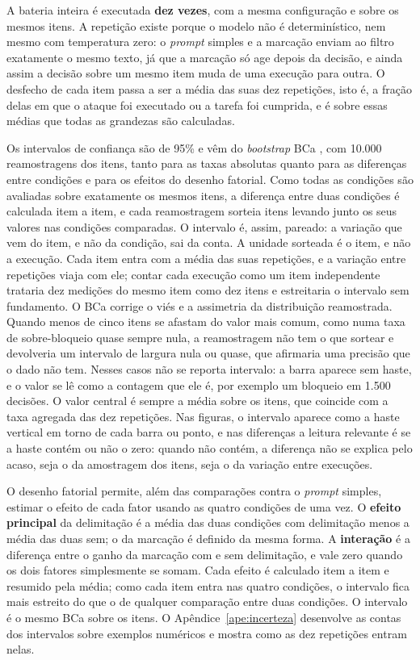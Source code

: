 A bateria inteira é executada \textbf{dez vezes}, com a mesma configuração e
sobre os mesmos itens. A repetição existe porque o modelo não é
determinístico, nem mesmo com temperatura zero: o \textit{prompt} simples e a
marcação enviam ao filtro exatamente o mesmo texto, já que a marcação só age
depois da decisão, e ainda assim a decisão sobre um mesmo item muda de uma
execução para outra. O desfecho de cada item passa a ser a média das suas dez
repetições, isto é, a fração delas em que o ataque foi executado ou a tarefa
foi cumprida, e é sobre essas médias que todas as grandezas são calculadas.

Os intervalos de confiança são de 95\% e vêm do \textit{bootstrap} BCa
\cite{efron1987better}, com 10.000 reamostragens dos itens, tanto para as
taxas absolutas quanto para as diferenças entre condições e para os efeitos
do desenho fatorial. Como todas as condições são avaliadas sobre exatamente
os mesmos itens, a diferença entre duas condições é calculada item a item, e
cada reamostragem sorteia itens levando junto os seus valores nas condições
comparadas. O intervalo é, assim, pareado: a variação que vem do item, e não
da condição, sai da conta. A unidade sorteada é o item, e não a execução.
Cada item entra com a média das suas repetições, e a variação entre
repetições viaja com ele; contar cada execução como um item independente
trataria dez medições do mesmo item como dez itens e estreitaria o intervalo
sem fundamento. O BCa corrige o viés e a assimetria da distribuição
reamostrada. Quando menos de cinco itens se afastam do valor mais comum, como
numa taxa de sobre-bloqueio quase sempre nula, a reamostragem não tem o que
sortear e devolveria um intervalo de largura nula ou quase, que afirmaria uma
precisão que o dado não tem. Nesses casos não se reporta intervalo: a barra
aparece sem haste, e o valor se lê como a contagem que ele é, por exemplo um
bloqueio em 1.500 decisões. O valor central é sempre a média sobre os itens, que
coincide com a taxa agregada das dez repetições. Nas figuras, o intervalo
aparece como a haste vertical em torno de cada barra ou ponto, e nas
diferenças a leitura relevante é se a haste contém ou não o zero: quando não
contém, a diferença não se explica pelo acaso, seja o da amostragem dos itens,
seja o da variação entre execuções.

O desenho fatorial permite, além das comparações contra o \textit{prompt}
simples, estimar o efeito de cada fator usando as quatro condições de uma vez.
O \textbf{efeito principal} da delimitação é a média das duas condições com
delimitação menos a média das duas sem; o da marcação é definido da mesma
forma. A \textbf{interação} é a diferença entre o ganho da marcação com e sem
delimitação, e vale zero quando os dois fatores simplesmente se somam. Cada
efeito é calculado item a item e resumido pela média; como cada item entra
nas quatro condições, o intervalo fica mais estreito do que o de qualquer
comparação entre duas condições. O intervalo é o mesmo BCa sobre os itens. O
Apêndice~\ref{ape:incerteza} desenvolve as contas dos intervalos sobre
exemplos numéricos e mostra como as dez repetições entram nelas.

